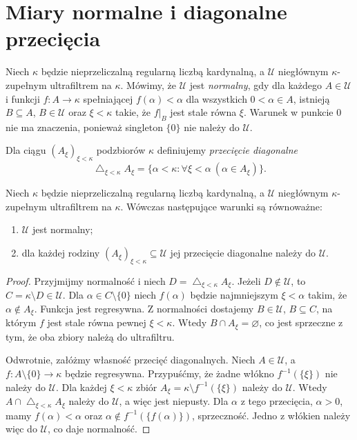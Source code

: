\section{Miary normalne i diagonalne przecięcia}

\begin{definicja}
\label{def:lc37-normal}
Niech $\kappa$ będzie nieprzeliczalną
regularną liczbą kardynalną, a $\mathcal U$
niegłównym $\kappa$-zupełnym
ultrafiltrem na $\kappa$.
Mówimy, że $\mathcal U$ jest
\emph{normalny}, gdy dla każdego
$A\in\mathcal U$ i funkcji
$f:A\to\kappa$ spełniającej
$f(\alpha)<\alpha$ dla
wszystkich $0<\alpha\in A$,
istnieją $B\subseteq A$,
$B\in\mathcal U$ oraz $\xi<\kappa$
takie, że $f|_B$ jest stale
równa $\xi$.
Warunek w punkcie $0$ nie ma
znaczenia, ponieważ singleton
$\{0\}$ nie należy do $\mathcal U$.
\end{definicja}

\begin{definicja}
\label{def:lc37-diagonal}
Dla ciągu $(A_\xi)_{\xi<\kappa}$
podzbiorów $\kappa$ definiujemy
\emph{przecięcie diagonalne}
\[
 \mathop{\triangle}_{\xi<\kappa}A_\xi
 =\{\alpha<\kappa:
    \forall\xi<\alpha\ (\alpha\in A_\xi)\}.
\]
\end{definicja}

\begin{twierdzenie}
\label{thm:lc37-normal-diagonal}
Niech $\kappa$ będzie nieprzeliczalną
regularną liczbą kardynalną, a $\mathcal U$
niegłównym $\kappa$-zupełnym
ultrafiltrem na $\kappa$.
Wówczas następujące warunki są równoważne:
\begin{enumerate}
\item $\mathcal U$ jest normalny;
\item dla każdej rodziny
$(A_\xi)_{\xi<\kappa}\subseteq\mathcal U$
jej przecięcie diagonalne należy
do $\mathcal U$.
\end{enumerate}
\end{twierdzenie}
\begin{proof}
Przyjmijmy normalność i niech
$D=\mathop{\triangle}_{\xi<\kappa}A_\xi$.
Jeżeli $D\notin\mathcal U$, to
$C=\kappa\setminus D\in\mathcal U$.
Dla $\alpha\in C\setminus\{0\}$
niech $f(\alpha)$ będzie
najmniejszym $\xi<\alpha$
takim, że $\alpha\notin A_\xi$.
Funkcja jest regresywna.
Z normalności dostajemy
$B\in\mathcal U$, $B\subseteq C$,
na którym $f$ jest stale równa
pewnej $\xi<\kappa$.
Wtedy $B\cap A_\xi=\varnothing$,
co jest sprzeczne z tym, że
oba zbiory należą do ultrafiltru.

Odwrotnie, załóżmy własność
przecięć diagonalnych.
Niech $A\in\mathcal U$,
a $f:A\setminus\{0\}\to\kappa$
będzie regresywna.
Przypuśćmy, że żadne włókno
$f^{-1}(\{\xi\})$ nie należy
do $\mathcal U$.
Dla każdej $\xi<\kappa$
zbiór
$A_\xi=\kappa\setminus f^{-1}(\{\xi\})$
należy do $\mathcal U$.
Wtedy $A\cap
 \mathop{\triangle}_{\xi<\kappa}A_\xi$
należy do $\mathcal U$,
a więc jest niepusty.
Dla $\alpha$ z tego przecięcia,
$\alpha>0$, mamy $f(\alpha)<\alpha$
oraz $\alpha\notin
 f^{-1}(\{f(\alpha)\})$, sprzeczność.
Jedno z włókien należy więc
do $\mathcal U$, co daje normalność.
\end{proof}

